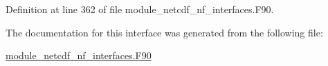 Definition at line 362 of file module\+\_\+netcdf\+\_\+nf\+\_\+interfaces.\+F90.



The documentation for this interface was generated from the following file\+:\begin{DoxyCompactItemize}
\item 
\hyperlink{module__netcdf__nf__interfaces_8F90}{module\+\_\+netcdf\+\_\+nf\+\_\+interfaces.\+F90}\end{DoxyCompactItemize}
